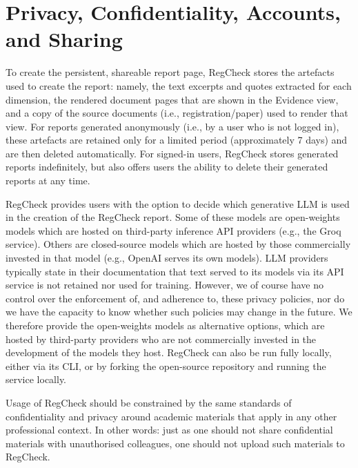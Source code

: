 \documentclass{article}
\begin{document}
\section{Privacy, Confidentiality, Accounts, and Sharing}\label{app:privacy}
To create the persistent, shareable report page, RegCheck stores the artefacts
used to create the report: namely, the text excerpts and quotes extracted for
each dimension, the rendered document pages that are shown in the Evidence view,
and a copy of the source documents (i.e., registration/paper) used to render
that view. For reports generated anonymously (i.e., by a user who is not logged
in), these artefacts are retained only for a limited period (approximately 7
days) and are then deleted automatically. For signed-in users, RegCheck stores
generated reports indefinitely, but also offers users the ability to delete
their generated reports at any time.

RegCheck provides users with the option to decide which generative LLM is used
in the creation of the RegCheck report. Some of these models are open-weights
models which are hosted on third-party inference API providers (e.g., the Groq
service). Others are closed-source models which are hosted by those commercially
invested in that model (e.g., OpenAI serves its own models). LLM providers
typically state in their documentation that text served to its models via its
API service is not retained nor used for training. However, we of course have no
control over the enforcement of, and adherence to, these privacy policies, nor
do we have the capacity to know whether such policies may change in the future.
We therefore provide the open-weights models as alternative options, which are
hosted by third-party providers who are not commercially invested in the
development of the models they host. RegCheck can also be run fully locally,
either via its CLI, or by forking the open-source repository and running the
service locally.

Usage of RegCheck should be constrained by the same standards of confidentiality
and privacy around academic materials that apply in any other professional
context. In other words: just as one should not share confidential materials
with unauthorised colleagues, one should not upload such materials to RegCheck.
\end{document}
